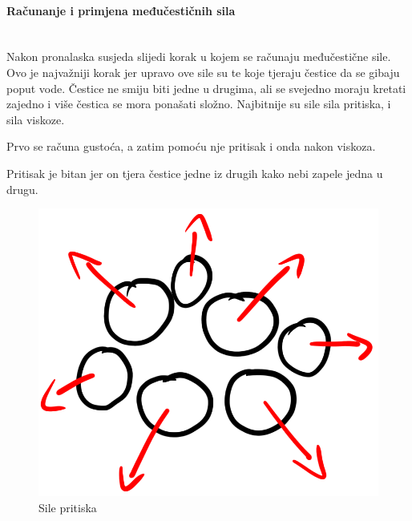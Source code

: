 \documentclass[diplomskirad]{fer}
\newcommand{\paragraphnewline}[1]{\paragraph{#1}\mbox{}\\}
\begin{document}
    \paragraphnewline{Računanje i primjena međučestičnih sila}

    Nakon pronalaska susjeda slijedi korak u kojem se računaju međučestične sile.
    Ovo je najvažniji korak jer upravo ove sile su te koje tjeraju čestice da se gibaju poput vode.
    Čestice ne smiju biti jedne u drugima, ali se svejedno moraju kretati zajedno i više čestica se mora ponašati složno.
    Najbitnije su sile sila pritiska, i sila viskoze.

    Prvo se računa gustoća, a zatim pomoću nje pritisak i onda nakon viskoza.

    Pritisak je bitan jer on tjera čestice jedne iz drugih kako nebi zapele jedna u drugu.
    \begin{figure}[H]
        \centering
        \includegraphics[scale=1]{images/pressureForce}
        \caption{
            Sile pritiska
        }
        \label{fig:pressureForce}
    \end{figure}
\end{document}

